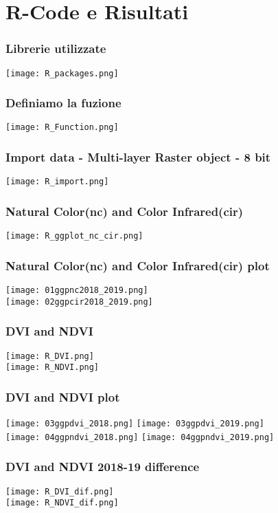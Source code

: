\documentclass{beamer}
\begin{document}
\section{R-Code e Risultati}
\begin{frame}
\frametitle{Librerie utilizzate}
\centering
\texttt{[image: R\_packages.png]}
\end{frame}

\begin{frame}
\frametitle{Definiamo la fuzione}
\centering
\texttt{[image: R\_Function.png]}
\end{frame}

\begin{frame}
\frametitle{Import data - Multi-layer Raster object - 8 bit}
\centering
\texttt{[image: R\_import.png]}
\end{frame}

\begin{frame}
\frametitle{Natural Color(nc) and Color Infrared(cir)}
\centering
\texttt{[image: R\_ggplot\_nc\_cir.png]}
\end{frame}

\begin{frame}
\frametitle{Natural Color(nc) and Color Infrared(cir) plot}
\centering
\texttt{[image: 01ggpnc2018\_2019.png]} \\  \texttt{[image: 02ggpcir2018\_2019.png]}
\end{frame}

\begin{frame}
\frametitle{DVI and NDVI}
\centering
\texttt{[image: R\_DVI.png]} \\
\texttt{[image: R\_NDVI.png]}
\end{frame}

\begin{frame}
\frametitle{DVI and NDVI plot}
\centering
\texttt{[image: 03ggpdvi\_2018.png]}
\texttt{[image: 03ggpdvi\_2019.png]} \\
\texttt{[image: 04ggpndvi\_2018.png]}
\texttt{[image: 04ggpndvi\_2019.png]}
\end{frame}

\begin{frame}
\frametitle{DVI and NDVI 2018-19 difference}
\centering
\texttt{[image: R\_DVI\_dif.png]} \\
\texttt{[image: R\_NDVI\_dif.png]}
\end{frame}
\end{document}
